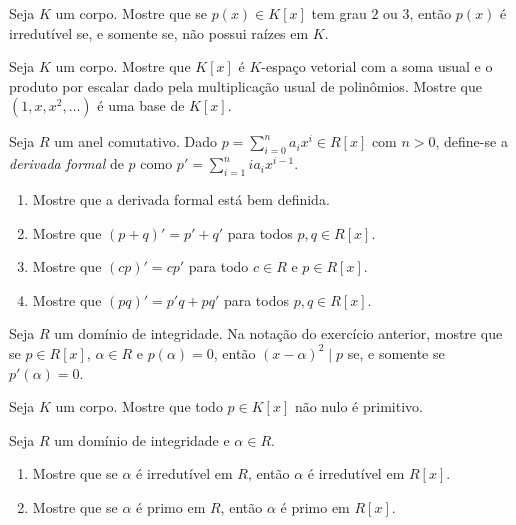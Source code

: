 \begin{exer}
    Seja $K$ um corpo. Mostre que se $p(x)\in K[x]$ tem grau $2$ ou $3$, então $p(x)$ é irredutível se, e somente se, não possui raízes em $K$.
\end{exer}

\begin{exer}
    Seja $K$ um corpo. Mostre que $K[x]$ é $K$-espaço vetorial com a soma usual e o produto por escalar dado pela multiplicação usual de polinômios. Mostre que $(1, x, x^2, \dots)$ é uma base de $K[x]$.
\end{exer}

\begin{exer}
    Seja $R$ um anel comutativo. Dado $p=\sum_{i=0}^n a_ix^i\in R[x]$ com $n>0$, define-se a \emph{derivada formal} de $p$ como $p'=\sum_{i=1}^{n} ia_i x^{i-1}$.
    \begin{enumerate}
        \item Mostre que a derivada formal está bem definida.
        \item Mostre que $(p+q)'=p'+q'$ para todos $p, q \in R[x]$.
        \item Mostre que $(cp)'=cp'$ para todo $c \in R$ e $p \in R[x]$.
        \item Mostre que $(pq)'=p'q+pq'$ para todos $p, q \in R[x]$.
    \end{enumerate}
\end{exer}

\begin{exer}
    Seja $R$ um domínio de integridade. Na notação do exercício anterior, mostre que se $p \in R[x]$, $\alpha \in R$ e $p(\alpha)=0$, então $(x-\alpha)^2\mid p$ se, e somente se $p'(\alpha)=0$.
\end{exer}

\begin{exer}
    Seja $K$ um corpo. Mostre que todo $p \in K[x]$ não nulo é primitivo.
\end{exer}

\begin{exer}\label{exer:irredutivelPrimo}
    Seja $R$ um domínio de integridade e $\alpha \in R$.
    \begin{enumerate}
        \item Mostre que se $\alpha$ é irredutível em $R$, então $\alpha$ é irredutível em $R[x]$.
        \item Mostre que se $\alpha$ é primo em $R$, então $\alpha$ é primo em $R[x]$.
    \end{enumerate}
\end{exer}

